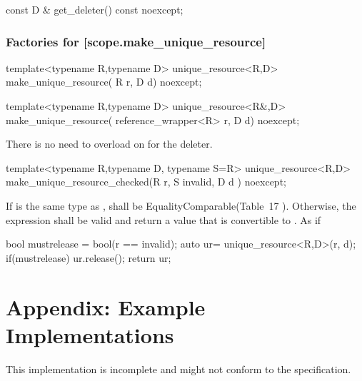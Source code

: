 \documentclass[ebook,11pt,article]{memoir}
\begin{document}
\begin{itemdecl}
const D & get_deleter() const noexcept;
\end{itemdecl}

\pnum
\returns {}

\subsection {Factories for  [scope.make_unique_resource]}
\begin{itemdecl}
template<typename R,typename D>
unique_resource<R,D>
make_unique_resource( R r, D d) noexcept;
\end{itemdecl}

\pnum
\returns {}

\begin{itemdecl}
template<typename R,typename D>
unique_resource<R&,D>
make_unique_resource( reference_wrapper<R> r, D d) noexcept;
\end{itemdecl}

\pnum
\returns {}

\pnum \enternote There is no need to overload on  for the deleter. \exitnote



\begin{itemdecl}
template<typename R,typename D, typename S=R>
unique_resource<R,D>
make_unique_resource_checked(R r, S invalid, D d ) noexcept;
\end{itemdecl}

\pnum
\requires If  is the same type as ,  shall be EqualityComparable(Table~17
). Otherwise, the expression  shall be valid and return a value that is convertible to . 
\pnum
\effects As if
\begin{codeblock}
  bool mustrelease = bool(r == invalid);
  auto ur= unique_resource<R,D>(r, d);
  if(mustrelease) ur.release();
  return ur;
\end{codeblock}

\newpage
\chapter{Appendix: Example Implementations}
This implementation is incomplete and might not conform to the specification.
\end{document}
